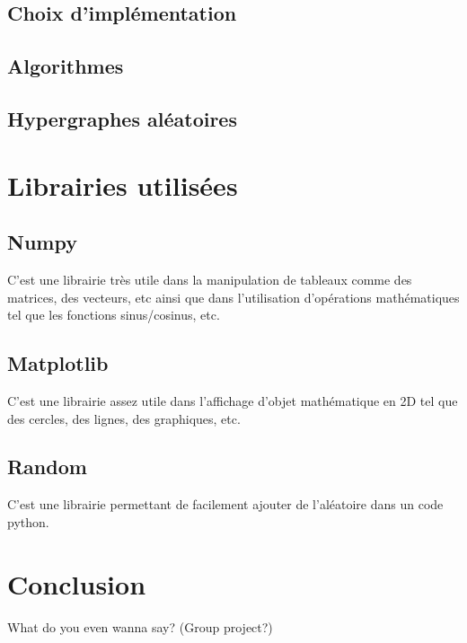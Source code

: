 \documentclass{article}
\begin{document}
	\subsection{Choix d'implémentation}
	
	\subsection{Algorithmes}
	
	\subsection{Hypergraphes aléatoires}
	
\section{Librairies utilisées}

\subsection{Numpy}
	C'est une librairie très utile dans la manipulation de tableaux comme des matrices, des vecteurs, etc ainsi que dans l'utilisation d'opérations mathématiques tel que les fonctions sinus/cosinus, etc.

\subsection{Matplotlib}
	C'est une librairie assez utile dans l'affichage d'objet mathématique en 2D tel que des cercles, des lignes, des graphiques, etc.
	
\subsection{Random}
	C'est une librairie permettant de facilement ajouter de l'aléatoire dans un code python.

\section{Conclusion}
	What do you even wanna say? (Group project?)
\end{document}
